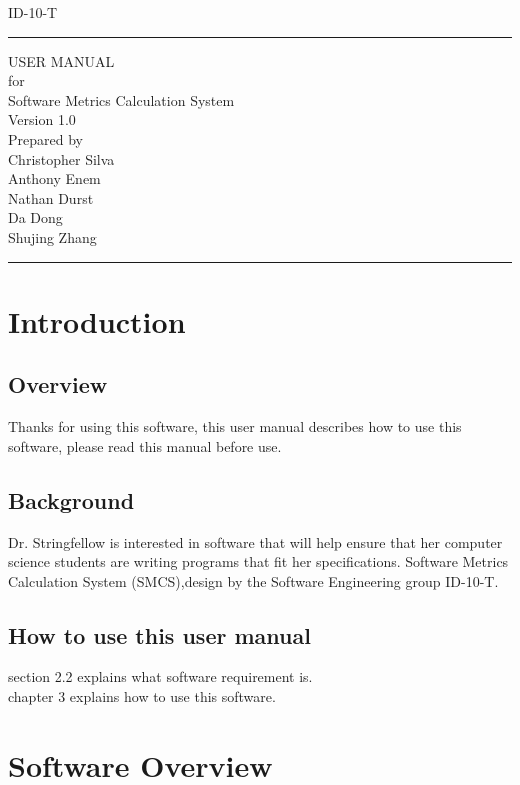 \documentclass{scrreprt}
\author{Christopher Silva}
\date{}
\def\myversion{1.0 }
\begin{document}
	\begin{titlepage}
		\flushright
		\LARGE{ID-10-T}
		\rule{16cm}{5pt}\vskip1cm
		\Huge{USER MANUAL}\\
		\vspace{2cm}
		for\\
		\vspace{2cm}
		Software Metrics Calculation System\\
		\vspace{2cm}
		\LARGE{Version \myversion\\}
		\vspace{2cm}
		Prepared by\\
	        Christopher Silva\\
		Anthony Enem\\
		Nathan Durst\\
		Da Dong\\
		Shujing Zhang\\
		\vfill
		\rule{16cm}{5pt}
	\end{titlepage}
	\tableofcontents	
	\chapter{Introduction}
	\section{Overview}
	Thanks for using this software, this user manual describes how to use this software, please read this manual  before use.
	\section{Background}
	Dr. Stringfellow  is interested in software that will help ensure that her computer science students are writing programs that fit her specifications.
	Software Metrics Calculation System (SMCS),design by the Software Engineering group ID-10-T.
	\section{How to use this user manual}
	section  2.2 explains what software requirement is.\\
	chapter 3   explains how to use this software.
		
	\chapter{Software Overview}
\end{document}

